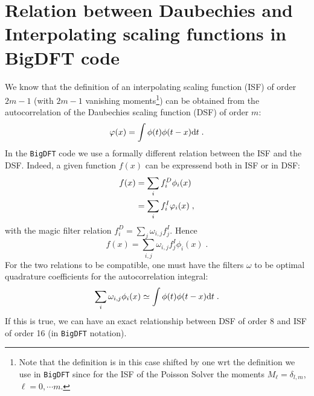 \documentclass[12pt]{article}
\begin{document}
\section{Relation between Daubechies and Interpolating scaling functions in BigDFT code}
We know that the definition of an interpolating scaling function (ISF) of order $2m-1$ (with $2m-1$ vanishing moments\footnote{Note that the definition is in this case shifted by one wrt the definition we use in {\tt BigDFT} since for the ISF of the Poisson Solver the moments $M_\ell=\delta_{l,m}$, $\ell=0,\cdots m$.}) can be obtained from the autocorrelation of the Daubechies scaling function (DSF) of order $m$:
\begin{equation}
 \varphi(x) =\int \phi(t) \phi(t-x) {\rm d}t\;.
\end{equation}
In the {\tt BigDFT} code we use a formally different relation between the ISF and the DSF.
Indeed, a given function $f(x)$ can be expressend both in ISF or in DSF:
\begin{align}
 f(x)&= \sum_i f^D_i \phi_i(x) \notag \\
 &= \sum_i f^I_i \varphi_i(x)\;,
\end{align}
with the magic filter relation $f^D_i=\sum_j \omega_{i,j} f^I_j$. Hence
\begin{equation}
 f(x)=\sum_{i,j} \omega_{i,j} f^I_j \phi_i(x)\;.
\end{equation}
For the two relations to be compatible, one must have the filters $\omega$ to be optimal quadrature coefficients for the autocorrelation integral:
\begin{equation}
\sum_{i} \omega_{i,j} \phi_i(x) \simeq \int \phi(t) \phi(t-x) {\rm d}t\;.
\end{equation}
If this is true, we can have an exact relationship between DSF of order 8 and ISF of order 16 (in {\tt BigDFT} notation).
\end{document}
